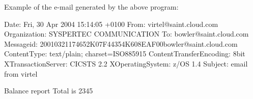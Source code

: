 \documentclass[letterpaper,10pt,english]{sphinxmanual}
\begin{document}
\begin{sphinxVerbatim}[commandchars=\\\{\}]
         
         
         
         
         
         
         
         
        
\end{sphinxVerbatim}


Example of the e-mail generated by the above program:

\begin{sphinxVerbatim}[commandchars=\\\{\}]
Date: Fri, 30 Apr 2004 15:14:05 +0100
From: virtel@saint.cloud.com
Organization: SYSPERTEC COMMUNICATION
To: bowler@saint.cloud.com
Message\PYGZhy{}id: \PYGZlt{}20010321174652K07F44354K608EAF00\PYGZhy{}bowler@saint.cloud.com\PYGZgt{}
Content\PYGZhy{}Type: text/plain; charset=ISO\PYGZhy{}8859\PYGZhy{}15
Content\PYGZhy{}Transfer\PYGZhy{}Encoding: 8bit
X\PYGZhy{}Transaction\PYGZhy{}Server: CICS\PYGZhy{}TS 2.2
X\PYGZhy{}Operating\PYGZhy{}System: z/OS 1.4
Subject: email from virtel

Balance report
Total is \texteuro{}2345
\end{sphinxVerbatim}
\end{document}
